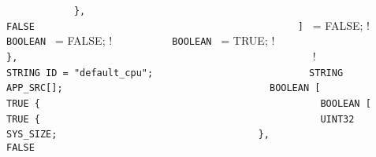 {{{%
\lstinline!            },                                       ! \newline
\lstinline!            FALSE                                    ! \newline
\lstinline!          ] ! = FALSE;        ! \newline
\lstinline!                                                     ! \newline
\lstinline!          BOOLEAN ! = FALSE;         ! \newline
\lstinline!          BOOLEAN ! = TRUE;  ! \newline
\lstinline!	                                                ! \newline
\lstinline!        },                                           ! \newline
\lstinline!        !\quad \quad{} {              ! \newline
\lstinline!          STRING ID = "default_cpu";                 ! \newline
\lstinline!          STRING APP_SRC[];                          ! \newline
\newline
\lstinline!          BOOLEAN [                                  ! \newline
\lstinline!            TRUE {                                   ! \newline
\lstinline!              BOOLEAN [                              ! \newline
\lstinline!                TRUE {                               ! \newline
\lstinline!                  UINT32 SYS_SIZE;                   ! \newline
\lstinline!                },                                   ! \newline
\lstinline!                FALSE                                ! \newline
}}}}
